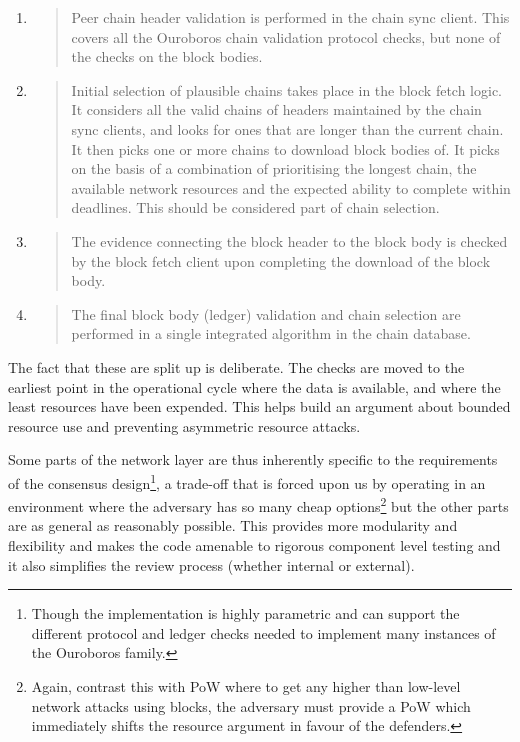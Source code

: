 \documentclass[11pt,a4paper]{article}
\begin{document}
\begin{enumerate}
\def\labelenumi{\arabic{enumi}.}
\item
  \begin{quote}
  Peer chain header validation is performed in the chain sync client.
  This covers all the Ouroboros chain validation protocol checks, but
  none of the checks on the block bodies.
  \end{quote}
\item
  \begin{quote}
  Initial selection of plausible chains takes place in the block fetch
  logic. It considers all the valid chains of headers maintained by the
  chain sync clients, and looks for ones that are longer than the
  current chain. It then picks one or more chains to download block
  bodies of. It picks on the basis of a combination of prioritising the
  longest chain, the available network resources and the expected
  ability to complete within deadlines. This should be considered part
  of chain selection.
  \end{quote}
\item
  \begin{quote}
  The evidence connecting the block header to the block body is checked
  by the block fetch client upon completing the download of the block
  body.
  \end{quote}
\item
  \begin{quote}
  The final block body (ledger) validation and chain selection are
  performed in a single integrated algorithm in the chain database.
  \end{quote}
\end{enumerate}

The fact that these are split up is deliberate. The checks are moved to
the earliest point in the operational cycle where the data is available,
and where the least resources have been expended. This helps build an
argument about bounded resource use and preventing asymmetric resource
attacks.

Some parts of the network layer are thus inherently specific to the
requirements of the consensus design\footnote{Though the implementation
  is highly parametric and can support the different protocol and ledger
  checks needed to implement many instances of the Ouroboros family.}, a
trade-off that is forced upon us by operating in an environment where
the adversary has so many cheap options\footnote{Again, contrast this
  with PoW where to get any higher than low-level network attacks using
  blocks, the adversary must provide a PoW which immediately shifts the
  resource argument in favour of the defenders.} but the other parts are
as general as reasonably possible. This provides more modularity and
flexibility and makes the code amenable to rigorous component level
testing and it also simplifies the review process (whether internal or
external).
\end{document}

